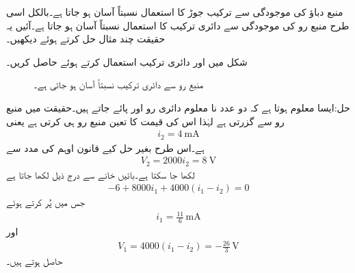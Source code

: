 منبع دباؤ کی موجودگی سے ترکیب جوڑ کا استعمال نسبتاً آسان ہو جاتا ہے۔بالکل اسی طرح منبع رو کی موجودگی سے دائری ترکیب کا استعمال نسبتاً آسان ہو جاتا ہے۔آئیں یہ حقیقت چند مثال حل کرتے ہوئے دیکھیں۔

شکل  میں  اور  دائری ترکیب استعمال کرتے ہوئے حاصل کریں۔

\begin{figure}
\centering
{}
\caption{منبع رو سے دائری ترکیب نسبتاً آسان ہو جاتی ہے۔}
\label{شکل_جوڑ_منبع_رو_آسان_ترکیب_دائری_الف}
\end{figure}%

حل:ایسا معلوم ہوتا ہے کہ دو عدد نا معلوم دائری رو  اور  پائے جاتے ہیں۔حقیقت میں  منبع رو سے گزرتی ہے لہٰذا اس کی قیمت کا تعین منبع رو ہی کرتی ہے یعنی
\begin{align*}
i_2=\SI{4}{\milli\ampere}
\end{align*}
ہے۔اس طرح بغیر حل کیے قانون اوہم کی مدد سے
\begin{align*}
V_2=2000 i_2=\SI{8}{\volt} 
\end{align*}
لکھا جا سکتا ہے۔بائیں خانے سے درج ذیل لکھا جاتا ہے
\begin{align*}
-6+8000i_1 +4000(i_1-i_2)=0
\end{align*}
جس میں  پُر کرتے ہوئے
\begin{align*}
i_1=\frac{11}{6} \, \si{\milli\ampere}
\end{align*}
اور
\begin{align*}
V_1=4000(i_1-i_2)=-\frac{26}{3} \,\si{\volt}
\end{align*}
حاصل ہوتے ہیں۔

